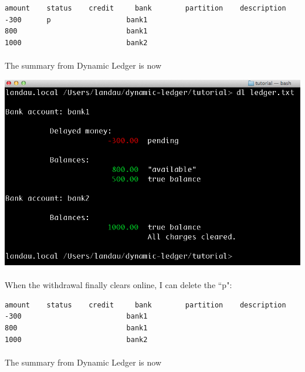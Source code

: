 \documentclass{article}
\begin{document}
\begin{flushleft}
\begin{lstlisting}[title=ledger.txt]
amount    status	credit     bank        partition    description
-300      p                  bank1
800                          bank1
1000                         bank2
\end{lstlisting}

\paragraph{} The summary from Dynamic Ledger is now

\begin{center}
\includegraphics[scale=.45]{fig/sum1.png}
\end{center}  

\paragraph{} When the withdrawal finally clears online, I can delete the ``p":

\begin{lstlisting}[title=ledger.txt]
amount    status	credit     bank        partition    description
-300                         bank1
800                          bank1
1000                         bank2
\end{lstlisting}

\paragraph{} The summary from Dynamic Ledger is now


\end{flushleft}
\end{document}
